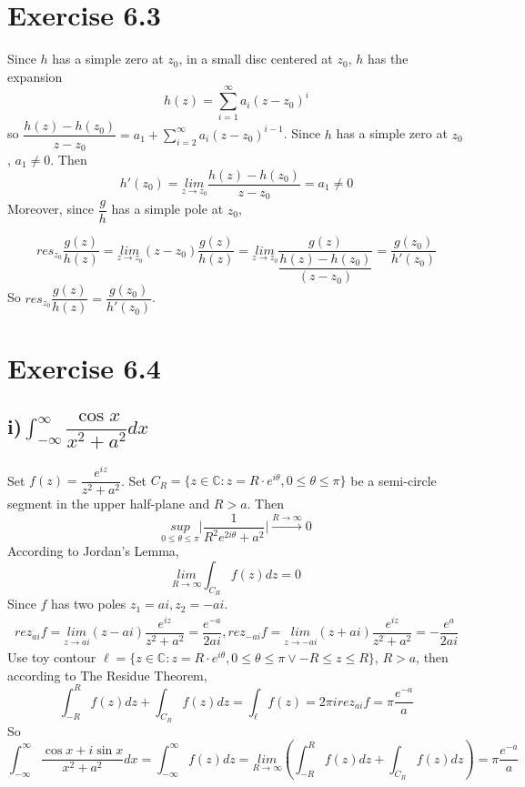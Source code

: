 \documentclass[a4paper,12pt,titlepage]{article}
\begin{document}
\section*{Exercise 6.3}
Since $h$ has a simple zero at $z_0$, in a small disc centered at $z_0$, $h$ has the expansion
$$h(z)=\sum\limits_{i=1}^{\infty}a_i(z-z_0)^i$$  
so $\dfrac{h(z)-h(z_0)}{z-z_0}=a_1+\sum\limits_{i=2}^{\infty}a_i(z-z_0)^{i-1}$. Since  $h$ has a simple zero at $z_0$, $a_1\neq0$. Then
$$h'(z_0)=\underset{z\rightarrow z_0}{lim}\dfrac{h(z)-h(z_0)}{z-z_0}=a_1\neq0$$
Moreover, since $\dfrac{g}{h}$ has a simple pole at $z_0$,

$$res_{z_0} \dfrac{g(z)}{h(z)} = \underset{z\rightarrow z_0}{lim}
(z-z_0)\dfrac{g(z)}{h(z)}= \underset{z\rightarrow z_0}{lim}
\dfrac{g(z)}{\dfrac{h(z)-h(z_0)}{(z-z_0)}}=\dfrac{g(z_0)}{h'(z_0)}$$
So $res_{z_0} \dfrac{g(z)}{h(z)}=\dfrac{g(z_0)}{h'(z_0)}$.


\section*{Exercise 6.4}
\subsection*{i)$\int_{-\infty}^{\infty}  \dfrac{\cos x}{x^2+a^2}dx$}
Set $f(z)=\dfrac{e^{iz}}{z^2+a^2}$. 
Set $C_R = \lbrace z \in \mathbb{C}: z = R\cdot e^{i\theta}, 0 \leqslant \theta \leqslant \pi\rbrace$ be a semi-circle segment in the upper half-plane and $R>a$. Then
$$\underset{0\leqslant \theta\leqslant\pi}{sup}
\big|\dfrac{1}{R^2e^{2i\theta}+a^2}\big|\xrightarrow{R\rightarrow\infty}0$$
According to Jordan's Lemma, 
$$\underset{R\rightarrow \infty}{lim}\int_{C_R}f(z)dz=0$$
Since $f$ has two poles $z_1=ai,z_2=-ai$.
\begin{align*}
rez_{ai}f=\underset{z\rightarrow ai}{lim}
(z-ai)\dfrac{e^{iz}}{z^2+a^2}=\dfrac{e^{-a}}{2ai},rez_{-ai}f=\underset{z\rightarrow -ai}{lim}
(z+ai)\dfrac{e^{iz}}{z^2+a^2}=-\dfrac{e^{a}}{2ai}
\end{align*}
Use toy contour $\ell= \lbrace z \in \mathbb{C}: z = R\cdot e^{i\theta}, 0 \leqslant \theta \leqslant \pi \vee -R\leqslant z\leqslant R\rbrace$, $R>a$, then according to The Residue Theorem, 
$$\int_{-R}^Rf(z)dz+\int_{C_R}f(z)dz=\int_{\ell}f(z)=2\pi irez_{ai}f=\pi \dfrac{e^{-a}}{a}$$
So
$$\int_{-\infty}^{\infty}\dfrac{\cos x+i\sin x}{x^2+a^2}dx=\int_{-\infty}^{\infty}f(z)dz=\underset{R\rightarrow \infty}{lim}(\int_{-R}^Rf(z)dz+\int_{C_R}f(z)dz)=\pi \dfrac{e^{-a}}{a}$$
\end{document}
